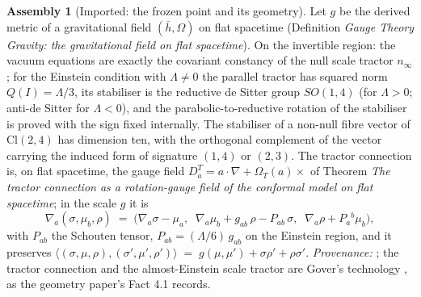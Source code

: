 \documentclass[11pt]{article}
\theoremstyle{definition}
\newtheorem{assembled}[theorem]{Assembly}
\theoremstyle{plain}
\newcommand{\changedmark}[2]{\marginpar{\raggedright\scriptsize\color{#1}#2}}
\providecommand{\Cl}{}\renewcommand{\Cl}{\mathrm{Cl}}
\providecommand{\hb}{}\renewcommand{\hb}{\bar{h}}
\providecommand{\nInf}{}\renewcommand{\nInf}{n_\infty}
\providecommand{\ip}{}\renewcommand{\ip}[2]{\langle #1, #2\rangle}
\begin{document}
\begin{assembled}[Imported: the frozen point and its geometry]\label{c:dark-energy.imported-frozen-point-geometry}
\changedmark{gray}{reworded}
Let $g$ be the derived metric of a gravitational field $(\hb, \Omega)$ on flat spacetime (Definition \emph{Gauge Theory Gravity: the gravitational field on flat spacetime}). On the invertible region: the vacuum equations are exactly the covariant constancy of the null scale tractor $\nInf$; for the Einstein condition with $\Lambda \neq 0$ the parallel tractor has squared norm $Q(I) = \Lambda/3$, its stabiliser is the reductive de Sitter group $SO(1,4)$ (for $\Lambda > 0$; anti-de Sitter for $\Lambda < 0$), and the parabolic-to-reductive rotation of the stabiliser is proved with the sign fixed internally. The stabiliser of a non-null fibre vector of $\Cl(2,4)$ has dimension ten, with the orthogonal complement of the vector carrying the induced form of signature $(1,4)$ or $(2,3)$. The tractor connection is, on flat spacetime, the gauge field $D^{T}_{a} = a \cdot \nabla + \Omega_{T}(a)\times$ of Theorem \emph{The tractor connection as a rotation-gauge field of the conformal model on flat spacetime}; in the scale $g$ it is
\begin{equation}
\nabla_a(\sigma, \mu_b, \rho) \;=\; \bigl(\nabla_a\sigma - \mu_a,\;\; \nabla_a\mu_b + g_{ab}\,\rho - P_{ab}\,\sigma,\;\; \nabla_a\rho + P_a{}^{b}\mu_b\bigr),
\end{equation}
with $P_{ab}$ the Schouten tensor, $P_{ab} = (\Lambda/6)\,g_{ab}$ on the Einstein region, and it preserves $\ip{(\sigma,\mu,\rho)}{(\sigma',\mu',\rho')} \;=\; g(\mu,\mu') + \sigma\rho' + \rho\sigma'$. \emph{Provenance:} \cite[Fact~4.1, Thms.~4.5, 4.7, Props.~4.4, 4.10, Lem.~4.8]{ButlerT6}; the tractor connection and the almost-Einstein scale tractor are Gover's technology \cite{Gover2010}, as the geometry paper's Fact 4.1 records.
\end{assembled}
\end{document}
